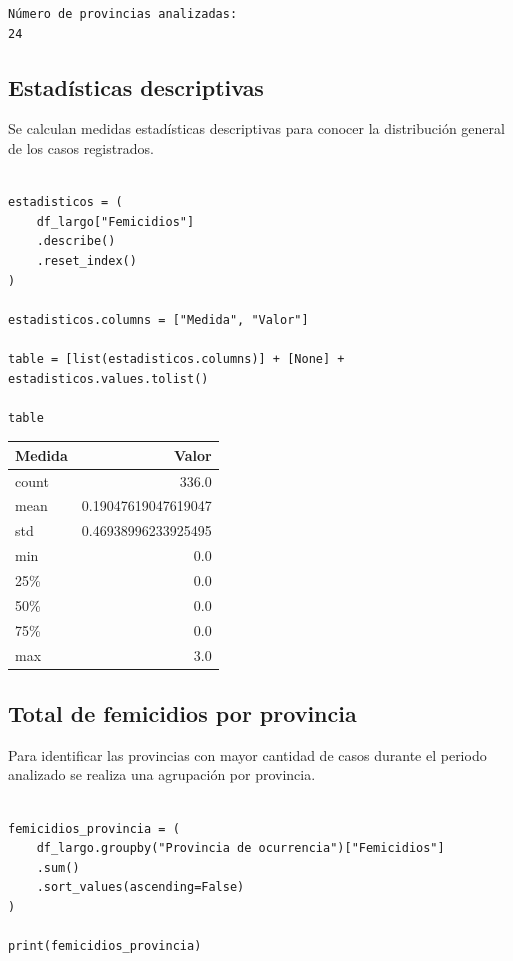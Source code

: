 \documentclass[11pt]{article}
\begin{document}
\begin{verbatim}
Número de provincias analizadas:
24
\end{verbatim}

\subsection{Estadísticas descriptivas}
\label{sec:org0a8b7f1}

Se calculan medidas estadísticas descriptivas para conocer la distribución
general de los casos registrados.

\begin{verbatim}

estadisticos = (
    df_largo["Femicidios"]
    .describe()
    .reset_index()
)

estadisticos.columns = ["Medida", "Valor"]

table = [list(estadisticos.columns)] + [None] + estadisticos.values.tolist()

table

\end{verbatim}
\begin{center}
\begin{tabular}{lr}
Medida & Valor\\[0pt]
\hline
count & 336.0\\[0pt]
mean & 0.19047619047619047\\[0pt]
std & 0.46938996233925495\\[0pt]
min & 0.0\\[0pt]
25\% & 0.0\\[0pt]
50\% & 0.0\\[0pt]
75\% & 0.0\\[0pt]
max & 3.0\\[0pt]
\end{tabular}
\end{center}

\subsection{Total de femicidios por provincia}
\label{sec:org5d102ba}

Para identificar las provincias con mayor cantidad de casos durante el
periodo analizado se realiza una agrupación por provincia.

\begin{verbatim}

femicidios_provincia = (
    df_largo.groupby("Provincia de ocurrencia")["Femicidios"]
    .sum()
    .sort_values(ascending=False)
)

print(femicidios_provincia)

\end{verbatim}
\end{document}

